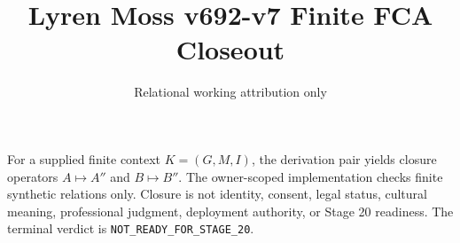 \documentclass{article}
\title{Lyren Moss v692-v7 Finite FCA Closeout}
\author{Relational working attribution only}
\begin{document}
\maketitle
For a supplied finite context $K=(G,M,I)$, the derivation pair yields closure operators $A\mapsto A''$ and $B\mapsto B''$. The owner-scoped implementation checks finite synthetic relations only. Closure is not identity, consent, legal status, cultural meaning, professional judgment, deployment authority, or Stage 20 readiness. The terminal verdict is \texttt{NOT\_READY\_FOR\_STAGE\_20}.
\end{document}
